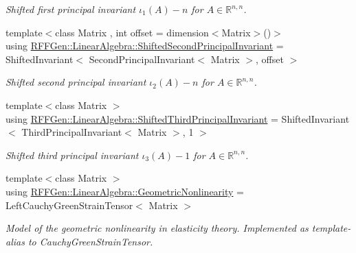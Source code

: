 \begin{DoxyCompactItemize}
\begin{DoxyCompactList}\small\item\em Shifted first principal invariant $ \iota_1(A) - n $ for $ A\in\mathbb{R}^{n,n} $. \end{DoxyCompactList}\item 
\hypertarget{group__LinearAlgebraGroup_ga8b827036929c8a747d0e901cdddf2f70}{{\footnotesize template$<$class Matrix , int offset = dimension$<$\-Matrix$>$()$>$ }\\using \hyperlink{group__LinearAlgebraGroup_ga8b827036929c8a747d0e901cdddf2f70}{R\-F\-F\-Gen\-::\-Linear\-Algebra\-::\-Shifted\-Second\-Principal\-Invariant} = Shifted\-Invariant$<$ Second\-Principal\-Invariant$<$ Matrix $>$, offset $>$}\label{group__LinearAlgebraGroup_ga8b827036929c8a747d0e901cdddf2f70}

\begin{DoxyCompactList}\small\item\em Shifted second principal invariant $ \iota_2(A) - n $ for $ A\in\mathbb{R}^{n,n} $. \end{DoxyCompactList}\item 
\hypertarget{group__LinearAlgebraGroup_gaa3670564453075521adb81bee7fa45e7}{{\footnotesize template$<$class Matrix $>$ }\\using \hyperlink{group__LinearAlgebraGroup_gaa3670564453075521adb81bee7fa45e7}{R\-F\-F\-Gen\-::\-Linear\-Algebra\-::\-Shifted\-Third\-Principal\-Invariant} = Shifted\-Invariant$<$ Third\-Principal\-Invariant$<$ Matrix $>$, 1 $>$}\label{group__LinearAlgebraGroup_gaa3670564453075521adb81bee7fa45e7}

\begin{DoxyCompactList}\small\item\em Shifted third principal invariant $ \iota_3(A) - 1 $ for $ A\in\mathbb{R}^{n,n} $. \end{DoxyCompactList}\item 
\hypertarget{group__LinearAlgebraGroup_ga435378ac8a773de0a3a8b3b8f67fee0c}{{\footnotesize template$<$class Matrix $>$ }\\using \hyperlink{group__LinearAlgebraGroup_ga435378ac8a773de0a3a8b3b8f67fee0c}{R\-F\-F\-Gen\-::\-Linear\-Algebra\-::\-Geometric\-Nonlinearity} = Left\-Cauchy\-Green\-Strain\-Tensor$<$ Matrix $>$}\label{group__LinearAlgebraGroup_ga435378ac8a773de0a3a8b3b8f67fee0c}

\begin{DoxyCompactList}\small\item\em Model of the geometric nonlinearity in elasticity theory. Implemented as template-\/alias to Cauchy\-Green\-Strain\-Tensor. \end{DoxyCompactList}\end{DoxyCompactItemize}
